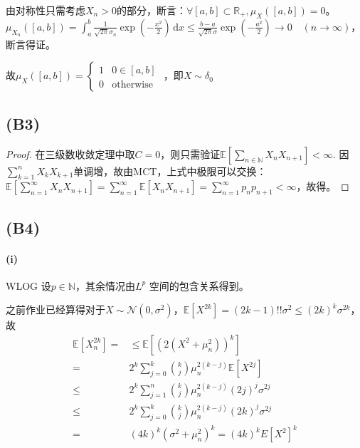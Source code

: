 \documentclass{ctexart}
\begin{document}
由对称性只需考虑$X_n>0$的部分，断言：$\forall [a,b]\subset \mathbb{R}_+, \mu_X \left( [a,b] \right)=0$。$\mu_{X_n} \left( [a,b] \right)=\int_{a}^{b} \frac{1}{\sqrt{2\pi}\sigma_n}\exp(-\frac{x^2}{2}) \,\mathrm{d}x\leq \frac{b-a}{\sqrt{2\pi}\sigma}\exp(-\frac{a^2}{2})\to 0 \quad(n\to \infty)$，断言得证。

故$\mu_X \left( [a,b] \right)=
\begin{cases}
  1& 0\in [a,b]\\ 0 &\text{otherwise}
\end{cases}
$
，即$X\sim \delta_0$
\subsection{(B3)}
\begin{proof}
  在三级数收敛定理中取$C=0$，则只需验证$\underset{}{\mathbb{E}}\left[ \sum\limits_{n\in \mathbb{N}}^{}X_{n}X_{n+1}\right]<\infty$. 因$\sum\limits _{k=1}^n X_kX_{k+1}$单调增，故由MCT，上式中极限可以交换：$\underset{}{\mathbb{E}}\left[ \sum\limits_{n=1}^{\infty}X_nX_{n+1}\right]=\sum\limits_{n=1}^{\infty}\underset{}{\mathbb{E}}\left[ X_nX_{n+1}\right]=\sum\limits_{n=1}^{\infty}p_np_{n+1}<\infty  $，故得。
\end{proof}

\subsection{(B4)}
\paragraph{(i)}
WLOG 设$p\in \mathbb{N}$，其余情况由$L^p$ 空间的包含关系得到。

之前作业已经算得对于$X\sim \mathcal{N}(0,\sigma^2)$，$\underset{}{\mathbb{E}}\left[ X^{2k}\right]=(2k-1)!!\sigma^2\leq (2k)^k\sigma^{2k} $，故
\begin{align*}
  \underset{}{\mathbb{E}}\left[ X_n^{2k}\right]=& \leq \underset{}{\mathbb{E}}\left[ (2(X^2+\mu_n^2))^{k}\right] \\
  =& 2^k \sum\limits_{j=0}^{k}\binom{k}{j}\mu_n^{2(k-j)} \underset{}{\mathbb{E}}\left[ X^{2j}\right]\\
     \leq & 2^k \sum\limits_{j=1}^{n}\binom{k}{j}\mu_n^{2(k-j)}(2j)^j\sigma^{2j}\\
  \leq& 2^k \sum\limits_{j=0}^{k} \binom{k}{j} \mu_{n}^{2(k-j)}(2k)^j\sigma^{2j}\\
  =&(4k)^k(\sigma^2+\mu_n^2)^k=(4k)^k E[X^2]^{k}
  \end{align*}
\end{document}
